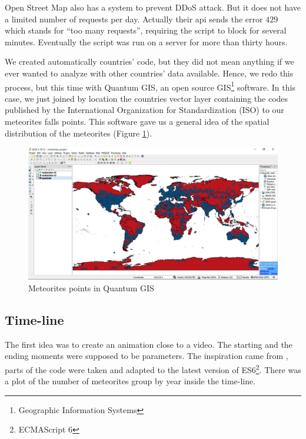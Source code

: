 \documentclass[10pt,conference,compsocconf]{IEEEtran}
\begin{document}
Open Street Map also has a system to prevent DDoS attack. But it does not have a limited number of requests per day. Actually their api sends the error $429$ which stands for ``too many requests'', requiring the script to block for several minutes. Eventually the script was run on a server for more than thirty hours.

We created automatically countries' code, but they did not mean anything if we ever wanted to analyze with other countries' data available. Hence, we redo this process, but this time with Quantum GIS, an open source GIS\footnote{Geographic Information Systems} software. In this case, we just joined by location the countries vector layer containing the codes published by the International Organization for Standardization (ISO) to our meteorites falls points. This software gave us a general idea of the spatial distribution of the meteorites (Figure \ref{fig:met_qgis}). 

\begin{figure}[H]
  \centering
  \includegraphics[width=\columnwidth]{images/meteorites_qgis}
  \vspace{-3mm}
  \caption{Meteorites points in Quantum GIS}
  \label{fig:met_qgis}
\end{figure}
 

\subsection{Time-line}

The first idea was to create an animation close to a video. The starting and the ending moments were supposed to be parameters. The inspiration came from \cite{ocks_brush_and_zoom}, parts of the code were taken and adapted to the latest version of ES6\footnote{ECMAScript 6}. There was a plot of the number of meteorites group by year inside the time-line.
\end{document}
